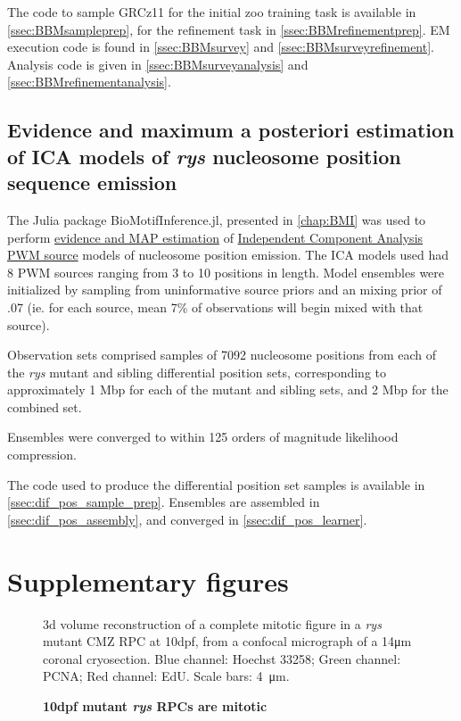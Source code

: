 The code to sample GRCz11 for the initial zoo training task is available in \autoref{ssec:BBMsampleprep}, for the refinement task in \autoref{ssec:BBMrefinementprep}. EM execution code is found in \autoref{ssec:BBMsurvey} and \autoref{ssec:BBMsurveyrefinement}. Analysis code is given in \autoref{ssec:BBMsurveyanalysis} and \autoref{ssec:BBMrefinementanalysis}.

\subsection{Evidence and maximum a posteriori estimation of ICA models of \textit{rys} nucleosome position sequence emission}
\label{ssec:rysBMI}
The Julia package BioMotifInference.jl, presented in \autoref{chap:BMI} was used to perform \hyperref[ssec:BayesEpistemology]{evidence and MAP estimation} of \hyperref[ssec:ICA]{Independent Component Analysis} \hyperref[ssec:PWM]{PWM source} models of nucleosome position emission. The ICA models used had 8 PWM sources ranging from 3 to 10 positions in length. Model ensembles were initialized by sampling from uninformative source priors and an mixing prior of .07 (ie. for each source, mean 7\% of observations will begin mixed with that source).

Observation sets comprised samples of 7092 nucleosome positions from each of the \textit{rys} mutant and sibling differential position sets, corresponding to approximately 1 Mbp for each of the mutant and sibling sets, and 2 Mbp for the combined set.

Ensembles were converged to within 125 orders of magnitude likelihood compression. 

The code used to produce the differential position set samples is available in \autoref{ssec:dif_pos_sample_prep}. Ensembles are assembled in \autoref{ssec:dif_pos_assembly}, and converged in \autoref{ssec:dif_pos_learner}.

\section{Supplementary figures}

\begin{figure}[!h]
    \caption{{\bf 10dpf mutant \textit{rys} RPCs are mitotic}} 3d volume reconstruction of a complete mitotic figure in a \textit{rys} mutant CMZ RPC at 10dpf, from a confocal micrograph of a 14\si{\micro\metre} coronal cryosection. Blue channel: Hoechst 33258; Green channel: PCNA; Red channel: EdU. Scale bars: \SI{4}{\micro\metre}.
    \label{rysmitosis}
\end{figure}

